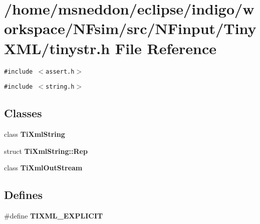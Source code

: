 \section{/home/msneddon/eclipse/indigo/workspace/NFsim/src/NFinput/TinyXML/tinystr.h File Reference}
\label{tinystr_8h}


{\tt \#include $<$assert.h$>$}\par
{\tt \#include $<$string.h$>$}\par
\subsection*{Classes}
\begin{CompactItemize}
\item 
class {\bf TiXmlString}
\item 
struct \textbf{TiXmlString::Rep}
\item 
class {\bf TiXmlOutStream}
\end{CompactItemize}
\subsection*{Defines}
\begin{CompactItemize}
\item 
\#define {\bf TIXML\_\-EXPLICIT}
\end{CompactItemize}
